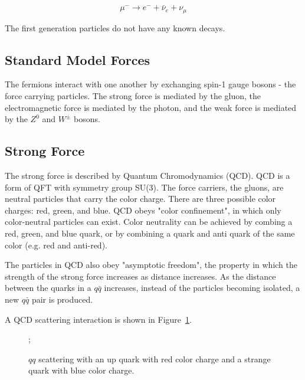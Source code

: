 \begin{equation}
	\mu^{-} \rightarrow e^{-} + \bar{\nu}_e + \nu_\mu
\end{equation}

 The first generation particles do not have any known decays.


\subsection{Standard Model Forces}

The fermions interact with one another by exchanging spin-1 gauge bosons - the force carrying particles. The strong force is mediated by the gluon, the electromagnetic force is mediated by the photon, and the weak force is mediated by the $Z^0$ and $W^{\pm}$ bosons. 

\subsection*{Strong Force}

The strong force is described by Quantum Chromodynamics (QCD). QCD is a form of QFT with symmetry group SU(3). The force carriers, the gluons, are neutral particles that carry the color charge. There are three possible color charges: red, green, and blue. QCD obeys "color confinement", in which only color-neutral particles can exist. Color neutrality can be achieved by combing a red, green, and blue quark, or by combining a quark and anti quark of the same color (e.g. red and anti-red).

The particles in QCD also obey "asymptotic freedom", the property in which the strength of the strong force increases as distance increases. As the distance between the quarks in a $q\bar{q}$ increases, instead of the particles becoming isolated, a new $q\bar{q}$ pair is produced.

A QCD scattering interaction is shown in Figure~\ref{fig:feynman_qq}.

\begin{figure}[h!]
	\centering
	;
	\caption{$qq$ scattering with an up quark with red color charge and a strange quark with blue color charge.}
	\label{fig:feynman_qq}
\end{figure} 



